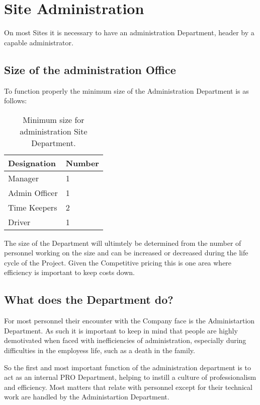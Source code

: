 \chapter{Site Administration}

On most Sites it is necessary to have an administration Department, header by a capable
administrator.

\section{Size of the administration Office}

To function properly the minimum size of the Administration Department is as follows:

\begin{table}
\begin{tabular}{ll}
\toprule
Designation    &Number\\
\midrule
Manager        &1\\
Admin Officer & 1\\
Time Keepers & 2\\
Driver            &1\\
\bottomrule
\end{tabular}
\caption{Minimum size for administration Site Department.}
\end{table}

The size of the Department will ultimtely be determined from the number of personnel working on the size
and can be increased or decreased during the life cycle of the Project. Given the Competitive pricing
this is one area where efficiency is important to keep costs down. 

\section{What does the Department do?}

For most personnel their encounter with the Company face is the Administartion Department. As such
it is important to keep in mind that people are highly demotivated when faced with inefficiencies of 
administration, especially during difficulties in the employess life, such as a death in the family.

So the first and most important function of the administration department is to act as an internal PRO
Department, helping to instill a culture of professionalism and efficiency. Most matters that relate
with personnel except for their technical work are handled by the Administartion Department.

